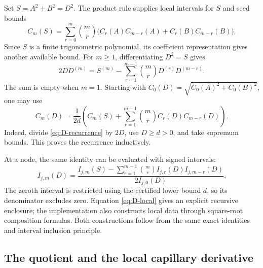 \documentclass[11pt]{article}
\numberwithin{equation}{section}
\begin{document}
Set $S=A^2+B^2=D^2$. The product rule supplies local intervals for $S$ and
seed bounds
\begin{equation}
 C_m(S)=\sum_{r=0}^{m}\binom mr
 \bigl(C_r(A)C_{m-r}(A)+C_r(B)C_{m-r}(B)\bigr).
 \label{eq:S-global}
\end{equation}
Since $S$ is a finite trigonometric polynomial, its coefficient
representation gives another available bound.
For $m\geq1$, differentiating $D^2=S$ gives
\begin{equation}
 2D D^{(m)}=S^{(m)}-
 \sum_{r=1}^{m-1}\binom mr D^{(r)}D^{(m-r)}.
 \label{eq:D-recurrence}
\end{equation}
The sum is empty when $m=1$. Starting with
$C_0(D)=\sqrt{C_0(A)^2+C_0(B)^2}$, one may use
\begin{equation}
 \boxed{C_m(D)=\frac{1}{2d}\left(
 C_m(S)+\sum_{r=1}^{m-1}\binom mr C_r(D)C_{m-r}(D)\right).}
 \label{eq:D-bound}
\end{equation}
Indeed, divide \eqref{eq:D-recurrence} by $2D$, use $D\geq d>0$, and take
supremum bounds. This proves the recurrence inductively.

At a node, the same identity can be evaluated with signed intervals:
\begin{equation}
 I_{j,m}(D)=\frac{I_{j,m}(S)-
 \sum_{r=1}^{m-1}\binom mr I_{j,r}(D)I_{j,m-r}(D)}{2I_{j,0}(D)}.
 \label{eq:D-local}
\end{equation}
The zeroth interval is restricted using the certified lower bound $d$, so
its denominator excludes zero. Equation \eqref{eq:D-local} gives an
explicit recursive enclosure; the implementation also constructs local
data through square-root composition formulas. Both constructions follow
from the same exact identities and interval inclusion principle.

\subsection{The quotient and the local capillary derivative}
\label{sec:Q-derivatives}
\end{document}
